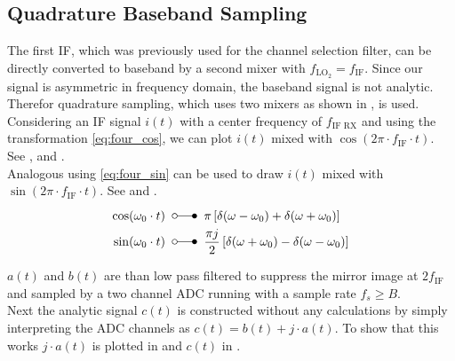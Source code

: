 \subsection{Quadrature Baseband Sampling}
\label{sec:rx_adc_1}
The first \gls{IF}, which was previously used for the channel selection filter,
can be directly converted to baseband by a second mixer with
$f_{\text{LO}_2} = f_{\text{IF}}$.
Since our signal is asymmetric in frequency domain,
the baseband signal is not analytic.
Therefor quadrature sampling, which uses two mixers as shown in
, is used. \\

Considering an \gls{IF} signal $i(t)$ with a center frequency of
$f_{\text{IF RX}}$ and using the transformation \eqref{eq:four_cos},
we can plot $i(t)$ mixed with $\cos(2\pi \cdot f_{\text{IF}} \cdot t)$.
See , 
and . \\

Analogous using \eqref{eq:four_sin} can be used to draw $i(t)$ mixed with
$\sin(2\pi \cdot f_{\text{IF}} \cdot t)$.
See  and . \\

\begin{align}
  \cos(\omega_0 \cdot t) \;\; & \laplace \;\; \pi
  \left[\delta(\omega - \omega_0) + \delta(\omega + \omega_0) \right]
  \label{eq:four_cos} \\
  \sin(\omega_0 \cdot t) \;\; & \laplace \;\; \frac{\pi j}{2}
  \left[\delta(\omega + \omega_0) - \delta(\omega - \omega_0) \right]
  \label{eq:four_sin}
\end{align}

$a(t)$ and $b(t)$ are than low pass filtered to suppress the mirror image
at $2 f_{\text{IF}}$ and sampled by a two channel \gls{ADC} running with a
sample rate $f_s \geq B$. \\

Next the analytic signal $c(t)$ is constructed without any calculations
by simply interpreting the \gls{ADC} channels as
$c(t) = b(t) + j \cdot a(t)$. To show that this works $j \cdot a(t)$
is plotted in  and
$c(t)$ in .

